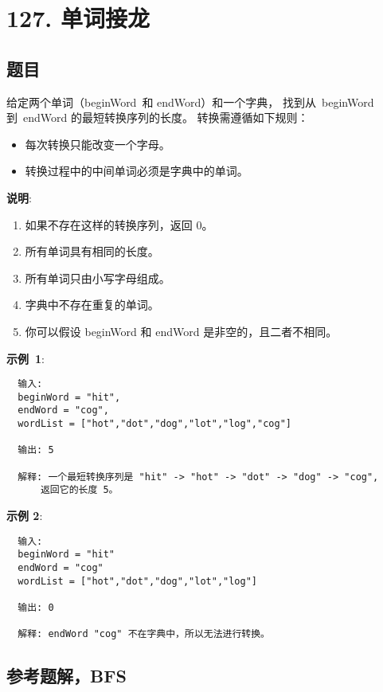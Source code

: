 \newpage
\section{127. 单词接龙}
\label{leetcode:127}

\subsection{题目}

给定两个单词（beginWord 和 endWord）和一个字典，
找到从 beginWord 到 endWord 的最短转换序列的长度。
转换需遵循如下规则：

\begin{itemize}
  \item 每次转换只能改变一个字母。
  \item 转换过程中的中间单词必须是字典中的单词。
\end{itemize}

\textbf{说明}:

\begin{enumerate}
  \item 如果不存在这样的转换序列，返回 0。
  \item 所有单词具有相同的长度。
  \item 所有单词只由小写字母组成。
  \item 字典中不存在重复的单词。
  \item 你可以假设 beginWord 和 endWord 是非空的，且二者不相同。
\end{enumerate}

\textbf{示例 1}:

\begin{verbatim}
  输入:
  beginWord = "hit",
  endWord = "cog",
  wordList = ["hot","dot","dog","lot","log","cog"]

  输出: 5

  解释: 一个最短转换序列是 "hit" -> "hot" -> "dot" -> "dog" -> "cog",
      返回它的长度 5。
\end{verbatim}

\textbf{示例 2}:

\begin{verbatim}
  输入:
  beginWord = "hit"
  endWord = "cog"
  wordList = ["hot","dot","dog","lot","log"]

  输出: 0

  解释: endWord "cog" 不在字典中，所以无法进行转换。
\end{verbatim}

\subsection{参考题解，BFS}

